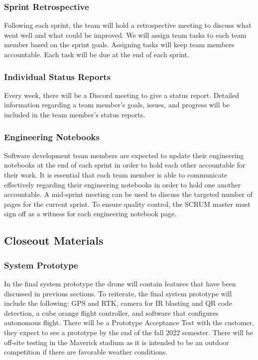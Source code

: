 \subsubsection{Sprint Retrospective}
Following each sprint, the team will hold a retrospective meeting to discuss what went well and what could be improved. We will assign team tasks to each team member based on the sprint goals. Assigning tasks will keep team members accountable. Each task will be due at the end of each sprint.

\subsubsection{Individual Status Reports}
Every week, there will be a Discord meeting to give a status report. Detailed information regarding a team member's goals, issues, and progress will be included in the team member's status reports.

\subsubsection{Engineering Notebooks}
Software development team members are expected to update their engineering notebooks at the end of each sprint in order to hold each other accountable for their work. It is essential that each team member is able to communicate effectively regarding their engineering notebooks in order to hold one another accountable. A mid-sprint meeting can be used to discuss the targeted number of pages for the current sprint. To ensure quality control, the SCRUM master must sign off as a witness for each engineering notebook page.

\subsection{Closeout Materials}

\subsubsection{System Prototype}
In the final system prototype the drone will contain features that have been discussed in previous sections. To reiterate, the final system prototype will include the following: GPS and RTK, camera for IR blasting and QR code detection, a cube orange flight controller, and software that configures autonomous flight. There will be a Prototype Acceptance Test with the customer, they expect to see a prototype by the end of the fall 2022 semester. There will be off-site testing in the Maverick stadium as it is intended to be an outdoor competition if there are favorable weather conditions.

